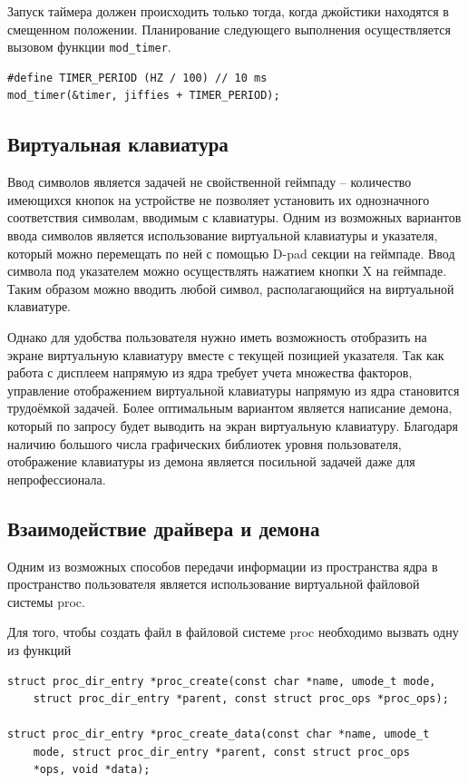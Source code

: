 Запуск таймера должен происходить только тогда, когда джойстики находятся в смещенном положении. Планирование следующего выполнения осуществляется вызовом функции \texttt{mod\_timer}.

\begin{small}
\begin{verbatim}
#define TIMER_PERIOD (HZ / 100) // 10 ms
mod_timer(&timer, jiffies + TIMER_PERIOD);
\end{verbatim}
\end{small}

\subsection{Виртуальная клавиатура}

Ввод символов является задачей не свойственной геймпаду -- количество имеющихся кнопок на устройстве не позволяет установить их однозначного соответствия символам, вводимым с клавиатуры. Одним из возможных вариантов ввода символов является использование виртуальной клавиатуры и указателя, который можно перемещать по ней с помощью D-pad секции на геймпаде. Ввод символа под указателем можно осуществлять нажатием кнопки X на геймпаде. Таким образом можно вводить любой символ, располагающийся на виртуальной клавиатуре.

Однако для удобства пользователя нужно иметь возможность отобразить на экране виртуальную клавиатуру вместе с текущей позицией указателя. Так как работа с дисплеем напрямую из ядра требует учета множества факторов, управление отображением виртуальной клавиатуры напрямую из ядра становится трудоёмкой задачей. Более оптимальным вариантом является написание демона, который по запросу будет выводить на экран виртуальную клавиатуру. Благодаря наличию большого числа графических библиотек уровня пользователя, отображение клавиатуры из демона является посильной задачей даже для непрофессионала.

\subsection{Взаимодействие драйвера и демона}

Одним из возможных способов передачи информации из пространства ядра в пространство пользователя является использование виртуальной файловой системы proc.

Для того, чтобы создать файл в файловой системе proc необходимо вызвать одну из функций

\begin{small}
\begin{verbatim}
struct proc_dir_entry *proc_create(const char *name, umode_t mode,
    struct proc_dir_entry *parent, const struct proc_ops *proc_ops);

struct proc_dir_entry *proc_create_data(const char *name, umode_t
    mode, struct proc_dir_entry *parent, const struct proc_ops
    *ops, void *data);
\end{verbatim}
\end{small}

